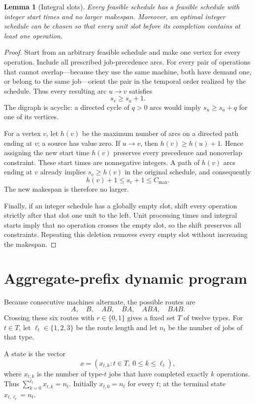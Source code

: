 \documentclass[11pt]{article}
\newtheorem{lemma}[theorem]{Lemma}
\newcommand{\Cmax}{C_{\max}}
\begin{document}
\begin{lemma}[Integral slots]\label{lem:integral}
Every feasible schedule has a feasible schedule with integer start times and
no larger makespan.  Moreover, an optimal integer schedule can be chosen so
that every unit slot before its completion contains at least one operation.
\end{lemma}

\begin{proof}
Start from an arbitrary feasible schedule and make one vertex for every
operation.  Include all prescribed job-precedence arcs.  For every pair of
operations that cannot overlap---because they use the same machine, both
have demand one, or belong to the same job---orient the pair in the temporal
order realized by the schedule.  Thus every resulting arc $u\to v$ satisfies
\[
 s_v\geq s_u+1.
\]
The digraph is acyclic: a directed cycle of $q>0$ arcs would imply
$s_u\geq s_u+q$ for one of its vertices.

For a vertex $v$, let $h(v)$ be the maximum number of arcs on a directed path
ending at $v$; a source has value zero.  If $u\to v$, then
$h(v)\geq h(u)+1$.  Hence assigning the new start time $h(v)$ preserves every
precedence and nonoverlap constraint.  These start times are nonnegative
integers.  A path of $h(v)$ arcs ending at $v$ already implies
$s_v\geq h(v)$ in the original schedule, and consequently
\[
 h(v)+1\leq s_v+1\leq \Cmax.
\]
The new makespan is therefore no larger.

Finally, if an integer schedule has a globally empty slot, shift every
operation strictly after that slot one unit to the left.  Unit processing
times and integral starts imply that no operation crosses the empty slot, so
the shift preserves all constraints.  Repeating this deletion removes every
empty slot without increasing the makespan.
\end{proof}

\section{Aggregate-prefix dynamic program}

Because consecutive machines alternate, the possible routes are
\[
 A,\quad B,\quad AB,\quad BA,\quad ABA,\quad BAB.
\]
Crossing these six routes with $r\in\{0,1\}$ gives a fixed set $T$ of twelve
types.  For $t\in T$, let $\ell_t\in\{1,2,3\}$ be the route length and let
$n_t$ be the number of jobs of that type.

A state is the vector
\[
 x=(x_{t,k}:t\in T,\ 0\leq k\leq\ell_t),
\]
where $x_{t,k}$ is the number of type-$t$ jobs that have completed exactly
$k$ operations.  Thus $\sum_{k=0}^{\ell_t}x_{t,k}=n_t$.  Initially
$x_{t,0}=n_t$ for every $t$; at the terminal state
$x_{t,\ell_t}=n_t$.
\end{document}
